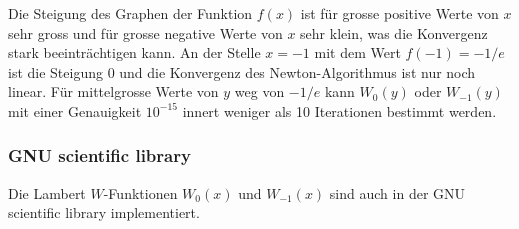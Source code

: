 Die Steigung des Graphen der Funktion $f(x)$ ist für grosse positive
Werte von $x$ sehr gross und für grosse negative Werte von $x$ sehr
klein, was die Konvergenz stark beeinträchtigen kann.
An der Stelle $x=-1$ mit dem Wert $f(-1)=-1/e$ ist die Steigung $0$
und die Konvergenz des Newton-Algorithmus ist nur noch linear.
Für mittelgrosse Werte von $y$ weg von $-1/e$ kann $W_0(y)$ oder $W_{-1}(y)$ 
mit einer Genauigkeit $10^{-15}$ innert weniger als 10 Iterationen
bestimmt werden.

%
%
\subsubsection{GNU scientific library}
Die Lambert $W$-Funktionen $W_0(x)$ und $W_{-1}(x)$ sind auch in der
GNU scientific library \cite{buch:library:gsl} implementiert.
%








